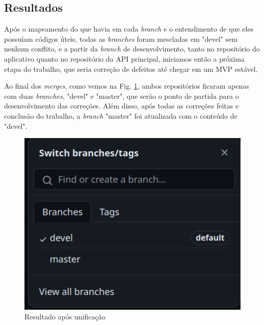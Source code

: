 \subsection{Resultados}

Após o mapeamento do que havia em cada \textit{branch} e o entendimento de que eles possuíam códigos úteis, todas as \textit{branches} foram mescladas em "devel" sem nenhum conflito, e a partir da \textit{branch} de desenvolvimento, tanto no repositório do aplicativo quanto no repositório da API principal, iniciamos então a próxima etapa do trabalho, que seria correção de defeitos até chegar em um MVP estável.

Ao final dos \textit{merges}, como vemos na Fig. \ref{branches_after}, ambos repositórios ficaram apenas com duas \textit{branches}, "devel" e "master", que serão o ponto de partida para o desenvolvimento das correções. Além disso, após todas as correções feitas e conclusão do trabalho, a \textit{branch} "master" foi atualizada com o conteúdo de "devel".

\begin{figure}[h]
	\centering
	\includegraphics[keepaspectratio=true,scale=0.5]{figuras/branches-after.png}
	\caption{Resultado após unificação}
 	\label{branches_after}
\end{figure}